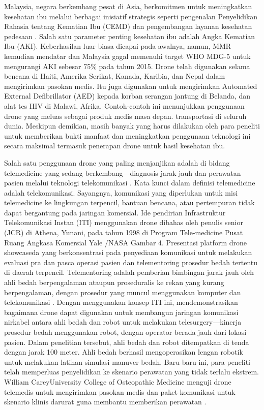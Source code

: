 Malaysia, negara berkembang pesat di Asia, berkomitmen untuk meningkatkan kesehatan ibu melalui berbagai inisiatif strategis seperti pengenalan Penyelidikan Rahasia tentang Kematian Ibu (CEMD) dan pengembangan layanan kesehatan pedesaan \citep{achanna2018maternal}. Salah satu parameter penting kesehatan ibu adalah Angka Kematian Ibu (AKI). Keberhasilan luar biasa dicapai pada awalnya, namun, MMR kemudian mendatar dan Malaysia gagal memenuhi target WHO MDG-5 untuk mengurangi AKI sebesar 75\% pada tahun 2015. Drone telah digunakan selama bencana di Haiti, Amerika Serikat, Kanada, Karibia, dan Nepal dalam mengirimkan pasokan medis. Itu juga digunakan untuk mengirimkan Automated External Defibrillator (AED) kepada korban serangan jantung di Belanda, dan alat tes HIV di Malawi, Afrika. Contoh-contoh ini menunjukkan penggunaan drone yang meluas sebagai produk medis masa depan. transportasi di seluruh dunia. Meskipun demikian, masih banyak yang harus dilakukan oleh para peneliti untuk memberikan bukti manfaat dan meningkatkan penggunaan teknologi ini secara maksimal termasuk penerapan drone untuk hasil kesehatan ibu.

Salah satu penggunaan drone yang paling menjanjikan adalah di bidang telemedicine yang sedang berkembang—diagnosis jarak jauh dan perawatan pasien melalui teknologi telekomunikasi \citep{breen2010evolutionary}. Kata kunci dalam definisi telemedicine adalah telekomunikasi. Sayangnya, komunikasi yang diperlukan untuk misi telemedicine ke lingkungan terpencil, bantuan bencana, atau pertempuran tidak dapat bergantung pada jaringan komersial. Ide pendirian Infrastruktur Telekomunikasi Instan (ITI) menggunakan drone dibahas oleh penulis senior (JCR) di Athena, Yunani, pada tahun 1998 di Program Tele-medicine Pusat Ruang Angkasa Komersial Yale /NASA Gambar 4. Presentasi platform drone showcaseda yang berkonsentrasi pada penyediaan komunikasi untuk melakukan evaluasi pra dan pasca operasi pasien dan telementoring prosedur bedah tertentu di daerah terpencil. Telementoring adalah pemberian bimbingan jarak jauh oleh ahli bedah berpengalaman ataupun proseduralis ke rekan yang kurang berpengalaman, dengan prosedur yang muncul menggunakan komputer dan telekomunikasi \citep{rosser1997telementoring}. Dengan menggunakan konsep ITI ini, \citet{harnett2008evaluation} mendemonstrasikan bagaimana drone dapat digunakan untuk membangun jaringan komunikasi nirkabel antara ahli bedah dan robot untuk melakukan telesurgery—kinerja prosedur bedah menggunakan robot, dengan operator berada jauh dari lokasi pasien. Dalam penelitian tersebut, ahli bedah dan robot ditempatkan di tenda dengan jarak 100 meter. Ahli bedah berhasil mengoperasikan lengan robotik untuk melakukan latihan simulasi manuver bedah. Baru-baru ini, para peneliti telah memperluas penyelidikan ke skenario perawatan yang tidak terlalu ekstrem. William CareyUniversity College of Osteopathic Medicine menguji drone telemedis untuk mengirimkan pasokan medis dan paket komunikasi untuk skenario klinis darurat guna membantu memberikan perawatan \citep{rosser2018surgical}.

